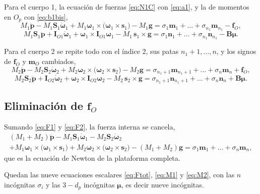 \documentclass[11pt]{article}
\newcommand{\pvec}{\mathbf{p}}
\newcommand{\wv}{\boldsymbol{\omega}}
\newcommand{\muv}{\boldsymbol{\mu}}
\newcommand{\IO}[1]{\mathbf{I}_{O#1}}
\begin{document}
Para el cuerpo 1, la ecuación de fuerzas \eqref{eq:N1C} con \eqref{eq:a1}, y la de momentos en $O_p$ con \eqref{eq:b1bis},
\begin{equation}
M_1\ddot{\pvec}-M_1\mathbf{S}_1\dot{\wv}_1+M_1\wv_1\times\big(\wv_1\times\mathbf{s}_1\big)-M_1\mathbf{g}
=\sigma_1\mathbf{m}_1+\dots+\sigma_{n_1}\mathbf{m}_{n_1}-\mathbf{f}_O ,
\label{eq:F1}
\end{equation}
\begin{equation}
M_1\mathbf{S}_1\ddot{\pvec}+\IO{1}\dot{\wv}_1+\wv_1\times\IO{1}\wv_1-M_1\,\mathbf{s}_1\times\mathbf{g}
=\sigma_1\mathbf{n}_1+\dots+\sigma_{n_1}\mathbf{n}_{n_1}-\mathbf{B}\muv .
\label{eq:M1}
\end{equation}

Para el cuerpo 2 se repite todo con el índice 2, sus patas $n_1+1,\dots,n$, y los signos de $\mathbf{f}_O$ y $\mathbf{m}_O$ cambiados,
\begin{equation}
M_2\ddot{\pvec}-M_2\mathbf{S}_2\dot{\wv}_2+M_2\wv_2\times\big(\wv_2\times\mathbf{s}_2\big)-M_2\mathbf{g}
=\sigma_{n_1+1}\mathbf{m}_{n_1+1}+\dots+\sigma_n\mathbf{m}_n+\mathbf{f}_O ,
\label{eq:F2}
\end{equation}
\begin{equation}
M_2\mathbf{S}_2\ddot{\pvec}+\IO{2}\dot{\wv}_2+\wv_2\times\IO{2}\wv_2-M_2\,\mathbf{s}_2\times\mathbf{g}
=\sigma_{n_1+1}\mathbf{n}_{n_1+1}+\dots+\sigma_n\mathbf{n}_n+\mathbf{B}\muv .
\label{eq:M2}
\end{equation}

\subsection{Eliminación de $\mathbf{f}_O$}

Sumando \eqref{eq:F1} y \eqref{eq:F2}, la fuerza interna se cancela,
\begin{multline}
(M_1+M_2)\ddot{\pvec}-M_1\mathbf{S}_1\dot{\wv}_1-M_2\mathbf{S}_2\dot{\wv}_2\\
+M_1\wv_1\times\big(\wv_1\times\mathbf{s}_1\big)+M_2\wv_2\times\big(\wv_2\times\mathbf{s}_2\big)
-(M_1+M_2)\mathbf{g}
=\sigma_1\mathbf{m}_1+\dots+\sigma_n\mathbf{m}_n ,
\label{eq:Ftot}
\end{multline}
que es la ecuación de Newton de la plataforma completa.

Quedan las nueve ecuaciones escalares \eqref{eq:Ftot}, \eqref{eq:M1} y \eqref{eq:M2}, con las $n$ incógnitas $\sigma_i$ y las $3-d_p$ incógnitas $\muv$, es decir nueve incógnitas.
\end{document}
